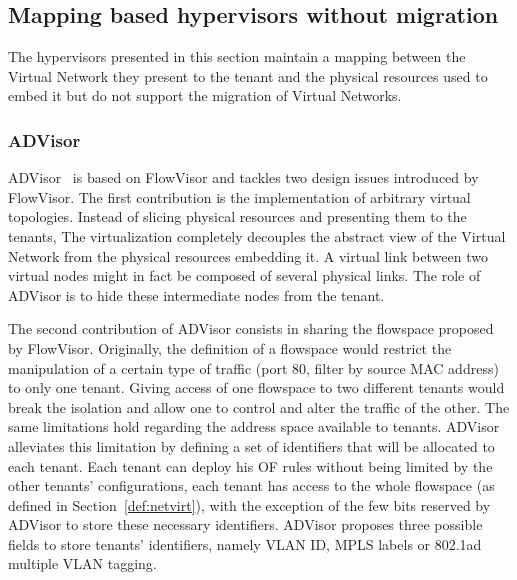 \subsection{Mapping based hypervisors without migration}
The hypervisors presented in this section maintain a mapping between the Virtual Network they present to the tenant and the physical resources used to embed it but do not support the migration of Virtual Networks.

\subsubsection{ADVisor}
ADVisor~\cite{ADVisor-Salvadori2012} is based on FlowVisor and tackles two design issues introduced by FlowVisor.
The first contribution is the implementation of arbitrary virtual topologies.
Instead of slicing physical resources and presenting them to the tenants, 
The virtualization completely decouples the abstract view of the Virtual Network from the physical resources embedding it.
A virtual link between two virtual nodes might in fact be composed of several physical links. The role of ADVisor is to hide these intermediate nodes from the tenant.

The second contribution of ADVisor consists in sharing the flowspace proposed by FlowVisor.
Originally, the definition of a flowspace would restrict the manipulation of a certain type of traffic (\eg port 80, filter by source MAC address) to only one tenant.
Giving access of one flowspace to two different tenants would break the isolation and allow one to control and alter the traffic of the other.
The same limitations hold regarding the address space available to tenants.
ADVisor alleviates this limitation by defining a set of identifiers that will be allocated to each tenant. Each tenant can deploy his OF rules without being limited by the other tenants' configurations, \ie each tenant has access to the whole flowspace (as defined in Section~\ref{def:netvirt}), with the exception of the few bits reserved by ADVisor to store these necessary identifiers.
ADVisor proposes three possible fields to store tenants' identifiers, namely VLAN ID, MPLS labels or 802.1ad multiple VLAN tagging.

